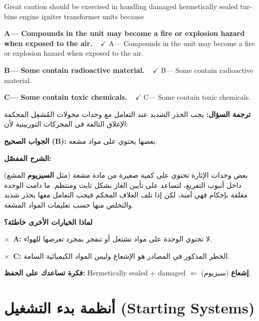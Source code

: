 \documentclass[11pt,a4paper]{article}
\newcommand{\en}[1]{\textenglish{#1}}
\newcommand{\correctletter}{}
\newcommand{\opt}[2]{%
  \ifdefstring{\correctletter}{#1}%
    {\textcolor{ansgreen}{\textbf{#1— #2\ \ $\checkmark$}}}%
    {#1— #2}\par}
\newcommand{\Q}[6]{%
  \renewcommand{\correctletter}{#6}%
  \par\bigskip
  \phantomsection\label{q#1}%
  \begin{tcolorbox}[enhanced,breakable,colback=qback,colframe=qframe,
      arc=2mm,boxrule=0.8pt,fonttitle=\bfseries,
      title={\en{Question #1}}]
    \begin{english}
      #2\par\smallskip
      \opt{A}{#3}\opt{B}{#4}\opt{C}{#5}
    \end{english}
  \end{tcolorbox}}
\newcommand{\tr}[1]{\textbf{\textcolor{qframe}{ترجمة السؤال:}} #1\par}
\newcommand{\ans}[2]{%
  \begin{tcolorbox}[colback=ansback,colframe=ansgreen,boxrule=0.6pt,arc=1.5mm,
      left=4pt,right=4pt,top=2pt,bottom=2pt]
    \textbf{\textcolor{ansgreen}{الجواب الصحيح (\en{#1}):}} #2
  \end{tcolorbox}}
\newcommand{\sharh}[1]{\textbf{\textcolor{conceptc}{الشرح المفصّل:}}\par #1\par}
\newcommand{\nohead}{\textbf{\textcolor{wrongc}{لماذا الخيارات الأخرى خاطئة؟}}\par}
\newcommand{\no}[2]{\hspace*{1em}\textcolor{wrongc}{$\times$}\ \textbf{\en{#1}:} #2\par}
\newcommand{\tip}[1]{%
  \begin{tcolorbox}[colback=tipback,colframe=tipframe,boxrule=0.5pt,arc=1.5mm,
      left=4pt,right=4pt,top=2pt,bottom=2pt]
    \textbf{فكرة تساعدك على الحفظ:} #1
  \end{tcolorbox}}
\begin{document}
\Q{8560}{Great caution should be exercised in handling damaged hermetically sealed turbine engine igniter transformer units because}
{Compounds in the unit may become a fire or explosion hazard when exposed to the air.}
{Some contain radioactive material.}
{Some contain toxic chemicals.}{B}
\tr{يجب الحذر الشديد عند التعامل مع وحدات محولات المُشعِل المحكمة الإغلاق التالفة في المحركات التوربينية لأن:}
\ans{B}{بعضها يحتوي على مواد مشعة.}
\sharh{بعض وحدات الإثارة تحتوي على كمية صغيرة من مادة مشعة (مثل \textbf{السيزيوم} المشع) داخل أنبوب التفريغ، لتساعد على تأيين الغاز بشكل ثابت ومنتظم. ما دامت الوحدة مغلقة بإحكام فهي آمنة، لكن إذا تلف الغلاف المحكم فيجب التعامل معها بحذر شديد والتخلص منها حسب تعليمات المواد المشعة.}
\nohead
\no{A}{لا تحتوي الوحدة على مواد تشتعل أو تنفجر بمجرد تعرضها للهواء.}
\no{C}{الخطر المذكور في المصادر هو الإشعاع وليس المواد الكيميائية السامة.}
\tip{\en{Hermetically sealed} + \en{damaged} $\Leftarrow$ \textbf{إشعاع} (سيزيوم).}

\newpage
\section{أنظمة بدء التشغيل (\en{Starting Systems})}
\end{document}

